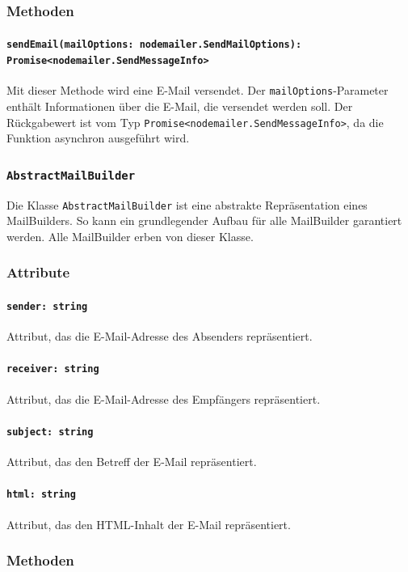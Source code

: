 \documentclass{entwurfsheft}
\begin{document}
\subsubsection*{Methoden}
\paragraph{\texttt{sendEmail(mailOptions: nodemailer.SendMailOptions): Promise<nodemailer.SendMessageInfo>}}
Mit dieser Methode wird eine E-Mail versendet. Der \texttt{mailOptions}-Parameter enthält Informationen über die E-Mail, die versendet werden soll. Der Rückgabewert ist vom Typ \texttt{Promise<nodemailer.SendMessageInfo>}, da die Funktion asynchron ausgeführt wird.

\subsubsection{\texttt{AbstractMailBuilder}}\label{sec:AbstractMailBuilder}
Die Klasse \texttt{AbstractMailBuilder} ist eine abstrakte Repräsentation eines MailBuilders. So kann ein grundlegender Aufbau für alle MailBuilder garantiert werden. Alle MailBuilder erben von dieser Klasse.
\subsubsection*{Attribute}
\paragraph{\texttt{sender: string}}
Attribut, das die E-Mail-Adresse des Absenders repräsentiert.
\paragraph{\texttt{receiver: string}}
Attribut, das die E-Mail-Adresse des Empfängers repräsentiert.
\paragraph{\texttt{subject: string}}
Attribut, das den Betreff der E-Mail repräsentiert.
\paragraph{\texttt{html: string}}
Attribut, das den HTML-Inhalt der E-Mail repräsentiert.

\subsubsection*{Methoden}
\end{document}
